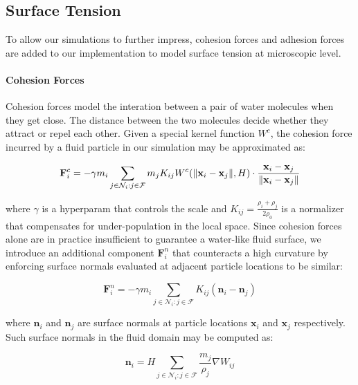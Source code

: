 \documentclass[
	11pt, 
	DIV10,
	ngerman,
	a4paper, 
	oneside, 
	headings=normal, 
	captions=tableheading,
	final, 
	numbers=noenddot
]{scrartcl}
\DeclarePairedDelimiter{\norm}{\lVert}{\rVert}
\begin{document}
\subsection{Surface Tension}

To allow our simulations to further impress, cohesion forces and adhesion forces are added to our implementation to model surface tension at microscopic level.

\paragraph{Cohesion Forces}

Cohesion forces model the interation between a pair of water molecules when they get close. The distance between the two molecules decide whether they attract or repel each other. Given a special kernel function $ W^{c} $, the cohesion force incurred by a fluid particle in our simulation may be approximated as:

\begin{equation}
	\label{eq25}
	\mathbf{F}_{i}^{c} = - \gamma m_{i} \sum_{j \in \mathcal{N}_{i}:j \in \mathcal{F}} m_j K_{ij} W^{c}(\norm{\mathbf{x}_{i} - \mathbf{x}_{j}}, H) \cdot \frac{\mathbf{x}_{i} - \mathbf{x}_{j}}{\norm{\mathbf{x}_{i} - \mathbf{x}_{j}}}
\end{equation}

where $ \gamma $ is a hyperparam that controls the scale and $ K_{ij} = \frac{\rho_{i} + \rho_{j}}{2\rho_{0}} $ is a normalizer that compensates for under-population in the local space. Since cohesion forces alone are in practice insufficient to guarantee a water-like fluid surface, we introduce an additional component $ \mathbf{F}_{i}^{n} $ that counteracts a high curvature by enforcing surface normals evaluated at adjacent particle locations to be similar:

\begin{equation}
	\label{eq26}
	\mathbf{F}_{i}^{n} = - \gamma m_{i} \sum_{j \in \mathcal{N}_{i}:j \in \mathcal{F}} K_{ij} (\mathbf{n}_{i} - \mathbf{n}_{j})
\end{equation}

where $ \mathbf{n}_{i} $ and $ \mathbf{n}_{j} $ are surface normals at particle locations $ \mathbf{x}_{i} $ and $ \mathbf{x}_{j} $ respectively. Such surface normals in the fluid domain may be computed as:

\begin{equation}
	\label{eq27}
	\mathbf{n}_{i} = H \sum_{j \in \mathcal{N}_{i}:j \in \mathcal{F}} \frac{m_{j}}{\rho_{j}} \nabla W_{ij}
\end{equation}
\end{document}
